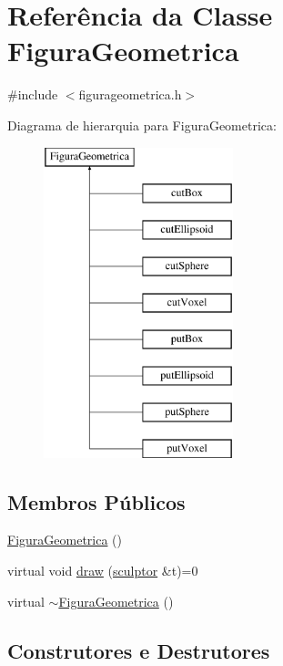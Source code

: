 \hypertarget{class_figura_geometrica}{}\section{Referência da Classe Figura\+Geometrica}
\label{class_figura_geometrica}


{\ttfamily \#include $<$figurageometrica.\+h$>$}

Diagrama de hierarquia para Figura\+Geometrica\+:\begin{figure}[H]
\begin{center}
\leavevmode
\includegraphics[height=9.000000cm]{class_figura_geometrica}
\end{center}
\end{figure}
\subsection*{Membros Públicos}
\begin{DoxyCompactItemize}
\item 
\mbox{\hyperlink{class_figura_geometrica_a81d7c7efaea511e60a15f5a363138dd9}{Figura\+Geometrica}} ()
\item 
virtual void \mbox{\hyperlink{class_figura_geometrica_ac996dac6561c450beaf5fd643e43e095}{draw}} (\mbox{\hyperlink{classsculptor}{sculptor}} \&t)=0
\item 
virtual \mbox{\hyperlink{class_figura_geometrica_ad13b9bccf1b14f6b9fbc662aad61ffd1}{$\sim$\+Figura\+Geometrica}} ()
\end{DoxyCompactItemize}


\subsection{Construtores e Destrutores}
\mbox{\label{class_figura_geometrica_a81d7c7efaea511e60a15f5a363138dd9}} 
